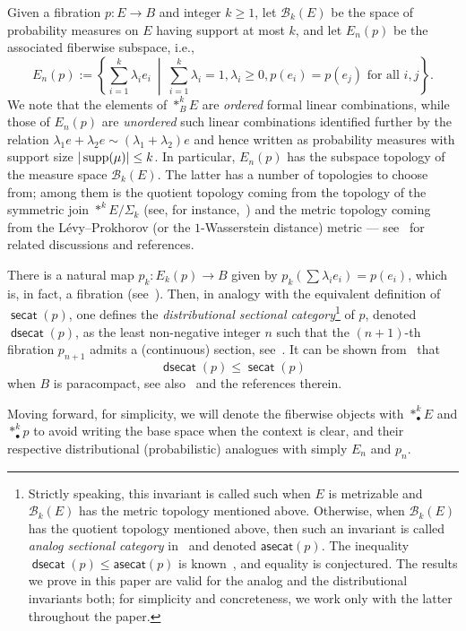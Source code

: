 \documentclass[amscd,amssymb,verbatim,10pt]{amsart}
\numberwithin{equation}{section}
\theoremstyle{plain}
\theoremstyle{definition}
\DeclareMathOperator{\secat}{{\mathsf{secat}}}
\DeclareMathOperator{\dsecat}{{\mathsf{dsecat}}}
\DeclareMathOperator{\supp}{{\rm supp}}
\def\scr{\mathcal}
\def\B{{\scr B}}
\begin{document}
Given a fibration $p\colon E\to B$ and integer $k\ge 1$, let $\B_k(E)$ be the space of probability measures on $E$ having support at most $k$, and let $E_n(p)$ be the associated fiberwise subspace, i.e.,
\[
E_n(p):=\left\{\sum_{i=1}^k\lambda_i e_i \ \middle| \ \sum_{i=1}^k\lambda_i=1,\lambda_i\ge 0, p(e_i)=p(e_j)\text{ for all } i,j  \right\}.
\]
We note that the elements of $\ast^k_BE$ are \emph{ordered} formal linear combinations, while those of $E_n(p)$ are \emph{unordered} such linear combinations identified further by the relation $\lambda_1e+\lambda_2e\sim (\lambda_1+\lambda_2)e$ and hence written as probability measures with support size $|\supp(\mu)|\le k$. In particular, $E_n(p)$ has the subspace topology of the measure space $\B_k(E)$. The latter has a number of topologies to choose from; among them is the quotient topology coming from the topology of the symmetric join $\ast^kE/\Sigma_k$ (see, for instance,~\cite{KK}) and the metric topology coming from the L\'evy--Prokhorov (or the $1$-Wasserstein distance) metric --- see~\cite{DJ,KW,Dr} for related discussions and references. 

There is a natural map $p_k\colon E_k(p)\to B$ given by $p_k(\sum\lambda_ie_i)=p(e_i)$, which is, in fact, a fibration (see~\cite{DJ}). Then, in analogy with the equivalent definition of $\secat(p)$, one defines the \emph{distributional sectional category}\footnote{Strictly speaking, this invariant is called such when $E$ is metrizable and $\B_k(E)$ has the metric topology mentioned above. Otherwise, when $\B_k(E)$ has the quotient topology mentioned above, then such an invariant is called \emph{analog sectional category} in~\cite{KW,KW2} and denoted $\mathsf{asecat}(p)$. The inequality $\dsecat(p)\le\mathsf{asecat}(p)$ is known~\cite{Ja1,KW2}, and equality is conjectured. The results we prove in this paper are valid for the analog and the distributional invariants both; for simplicity and concreteness, we work only with the latter throughout the paper.} of $p$, denoted $\dsecat(p)$, as the least non-negative integer $n$ such that the $(n+1)$-th fibration $p_{n+1}$ admits a (continuous) section, see~\cite{DJ,KW,Ja1}. It can be shown from~\cite{KK} that 
\[
\dsecat(p)\le\secat(p)
\]
when $B$ is paracompact, see also~\cite{Dr,JO} and the references therein.

Moving forward, for simplicity, we will denote the fiberwise objects with $\ast^k_{\bullet}E$ and $\ast^k_{\bullet}p$ to avoid writing the base space when the context is clear, and their respective distributional (probabilistic) analogues with simply $E_n$ and $p_n$.
\end{document}
